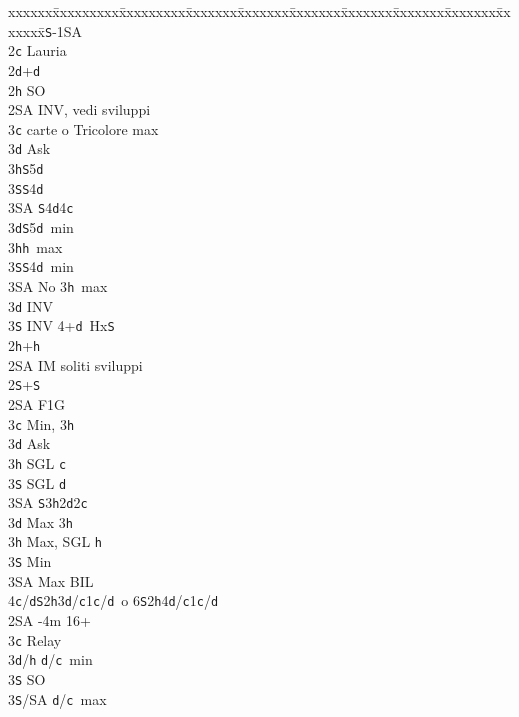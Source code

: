 \documentclass[a4paper,italian]{article}
\newcommand{\BS}{\small{\texttt{S}}}
\newcommand{\BC}{\small{\texttt{c}}}
\newcommand{\BD}{\small{\texttt{d}}}
\newcommand{\BH}{\small{\texttt{h}}}
\newenvironment{bidtable}
{\begin{tabbing}

    xxxxxx\=xxxxxxxxx\=xxxxxxxxx\=xxxxxxx\=xxxxxxx\=xxxxxxx\=xxxxxxx\=xxxxxxx\=xxxxxxx\=xxxxxxx\=\kill}
{\end{tabbing} }%
\begin{document}
\begin{multicols}{2}
    \begin{bidtable}
        1\BS-1\small{SA}\+\\
        2\BC \> Lauria\\
        2\BD {}+\BD \+\\
        2\BH \> SO\\
        2\small{SA} \> INV, vedi sviluppi\+\\
        3\BC {} carte o Tricolore max\+\\
        3\BD \> Ask\+\\
        3\BH {}\BS 5\BD \\
        3\BS {}\BS 4\BD \\
        3\small{SA} \BS 4\BD 4\BC \-\-\\
        3\BD {}\BS 5\BD\ min\\
        3\BH {}\BH\ max\\
        3\BS {}\BS 4\BD\ min\\
        3\small{SA} \> No 3\BH\ max\-\\
        3\BD \> INV\\
        3\BS \> INV 4+\BD\ Hx\BS \-\\
        2\BH {}+\BH \+\\
        2\small{SA} \> IM soliti sviluppi\-\\
        2\BS {}+\BS \+\\
        2\small{SA} \> F1G\+\\
        3\BC \> Min, 3\BH \+\\
        3\BD \> Ask\+\\
        3\BH \> SGL \BC \\
        3\BS \> SGL \BD \\
        3\small{SA} \BS3\BH2\BD2\BC \-\-\\
        3\BD \> Max 3\BH \\
        3\BH \> Max, SGL \BH\\
        3\BS \> Min\\
        3\small{SA} \> Max BIL\\
        4\BC/\BD {}\BS2\BH3\BD/\BC1\BC/\BD\ o 6\BS2\BH4\BD/\BC1\BC/\BD\-\-\\
        2\small{SA} -4m 16+\+\\
        3\BC \> Relay\+\\
        3\BD/\BH \> \BD /\BC\ min\+\\
        3\BS \> SO\-\\
        3\BS/SA \> \BD /\BC\ max\-\\

\end{bidtable}
\end{multicols}
\end{document}
